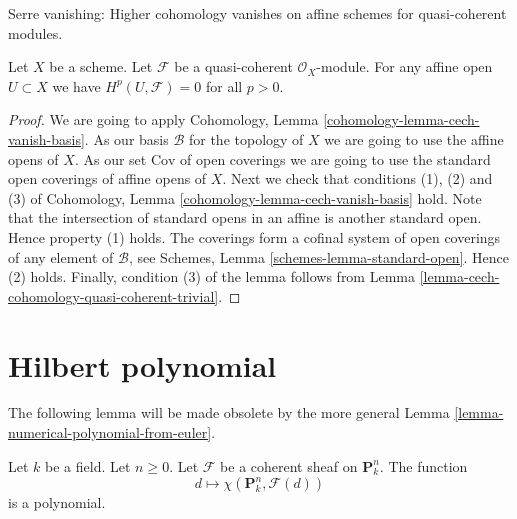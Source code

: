 \begin{lemma}
\label{lemma-quasi-coherent-affine-cohomology-zero}
\begin{slogan}
Serre vanishing: Higher cohomology vanishes on affine schemes
for quasi-coherent modules.
\end{slogan}
Let $X$ be a scheme.
Let $\mathcal{F}$ be a quasi-coherent $\mathcal{O}_X$-module.
For any affine open $U \subset X$ we have
$H^p(U, \mathcal{F}) = 0$ for all $p > 0$.
\end{lemma}

\begin{proof}
We are going to apply
Cohomology, Lemma \ref{cohomology-lemma-cech-vanish-basis}.
As our basis $\mathcal{B}$ for the topology of $X$ we are going to use
the affine opens of $X$.
As our set $\text{Cov}$ of open coverings we are going to use the standard
open coverings of affine opens of $X$.
Next we check that conditions (1), (2) and (3) of
Cohomology, Lemma \ref{cohomology-lemma-cech-vanish-basis}
hold. Note that the intersection of standard opens in an affine is
another standard open. Hence property (1) holds.
The coverings form a cofinal system of open coverings of any element
of $\mathcal{B}$, see
Schemes, Lemma \ref{schemes-lemma-standard-open}.
Hence (2) holds.
Finally, condition (3) of the lemma follows from
Lemma \ref{lemma-cech-cohomology-quasi-coherent-trivial}.
\end{proof}

\section{Hilbert polynomial}
\label{section-Hilbert-polynomial}

\noindent
The following lemma will be made obsolete by the more general
Lemma \ref{lemma-numerical-polynomial-from-euler}.

\begin{lemma}
\label{lemma-hilbert-polynomial}
Let $k$ be a field. Let $n \geq 0$. Let $\mathcal{F}$ be a coherent sheaf
on $\mathbf{P}^n_k$. The function
$$
d \longmapsto \chi(\mathbf{P}^n_k, \mathcal{F}(d))
$$
is a polynomial.
\end{lemma}

